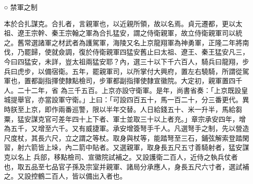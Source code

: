 \begin{pinyinscope}
 ○
 禁軍之制



 本於合扎謀克。合扎者，言親軍也，以近親所領，故以名焉。貞元遷都，更以太祖、遼王宗幹、秦王宗翰之軍為合扎猛安，謂之侍衛親軍，故立侍衛親軍司以統之。舊常選諸軍之材武者為護駕軍，海陵又名上京龍翔軍為神勇軍，正隆二年將南伐，乃罷歸，使就僉調，復於侍衛親軍四猛安舊止曰太祖、遼王、秦王猛安凡三，今曰四猛安，未詳，豈太祖兩猛安耶？內，選三十以下千六百人，騎兵曰龍翔，步兵曰虎步，以備宿衛。五年，罷親軍司，以所掌付大興府，置左右驍騎，所謂從駕軍也，置都副指揮使隸點檢司，步軍都副指揮使隸宣徽院。大定初，親軍置四千人。二十二年，省
 為三千五百。上京亦設守衛軍。是年，尚書省奏：「上京既設皇城提舉官，亦當設軍守衛。」上曰：「可設四百五十，馬一百二十，分三番更代。異時朕至上京，即作兩番巡警，限以半年交替。人日給錢五十、米一升半，馬給芻粟，猛安謀克官可差年四十上下者、軍士並取三十以上者充。」章宗承安四年，增為五千，又增至六千。又有威捷軍。承安增簽弩手千人。凡選弩手之制，先以營造尺度杖，其長六尺，立之謂之等杖。取身與杖等，能踏弩至三石，鋪弦解索登踏閑習，射六箭皆上垛，內二箭中貼者。又選親軍，取身長五尺五寸善騎射者，猛安謀克以名上
 兵部，移點檢司、宣徽院試補之。又設護衛二百人，近侍之執兵仗者也，取五品至七品官子孫及宗室并親軍、諸局分承應人，身長五尺六寸者，選試補之。又設控鶴二百人，皆以備出入者也。




\end{pinyinscope}
